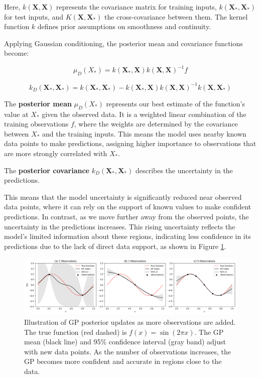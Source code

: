 \documentclass{ut-thesis}
\begin{document}
Here, $ k(\mathbf{X},\mathbf{X}) $ represents the covariance matrix for training inputs, $ k(\mathbf{X_*},\mathbf{X_*} ) $ for test inputs, and $ K(\mathbf{X},\mathbf{X_*}) $ the cross-covariance between them. The kernel function $ k $ defines prior assumptions on smoothness and continuity.

Applying Gaussian conditioning, the posterior mean and covariance functions become:

\begin{equation}
    \mu_D(X_*) = k(\mathbf{X_*}, \mathbf{X}) k(\mathbf{X}, \mathbf{X})^{-1} f
\end{equation}

\begin{equation}
    k_D(\mathbf{X_*}, \mathbf{X_*}) = k(\mathbf{X_*}, \mathbf{X_*}) - k(\mathbf{X_*}, \mathbf{X}) k(\mathbf{X}, \mathbf{X})^{-1} k(\mathbf{X}, \mathbf{X_*})
\end{equation}

The \textbf{posterior mean} \( \mu_D(X_*) \) represents our best estimate of the function's value at \( X_* \) given the observed data. It is a weighted linear combination of the training observations \( f \), where the weights are determined by the covariance between \( X_* \) and the training inputs. This means the model uses nearby known data points to make predictions, assigning higher importance to observations that are more strongly correlated with \( X_* \).

The \textbf{posterior covariance} \( k_D(\mathbf{X_*}, \mathbf{X_*}) \) describes the uncertainty in the predictions. 

This means that the model uncertainty is significantly reduced near observed data points, where it can rely on the support of known values to make confident predictions. In contrast, as we move further away from the observed points, the uncertainty in the predictions increases. This rising uncertainty reflects the model’s limited information about these regions, indicating less confidence in its predictions due to the lack of direct data support, as shown in Figure \ref{fig:gp_updates}.

\begin{figure}[htbp]
    \centering
    \includegraphics[width=\textwidth]{gp_post.png}
    \caption[Gaussian Process updates with added observations]{
        Illustration of GP posterior updates as more observations are added. 
        The true function (red dashed) is \( f(x) = \sin(2\pi x) \). 
        The GP mean (black line) and 95\% confidence interval (gray band) adjust with new data points.
        As the number of observations increases, the GP becomes more confident and accurate in regions close to the data.
    }
    \label{fig:gp_updates}
\end{figure}
\end{document}
